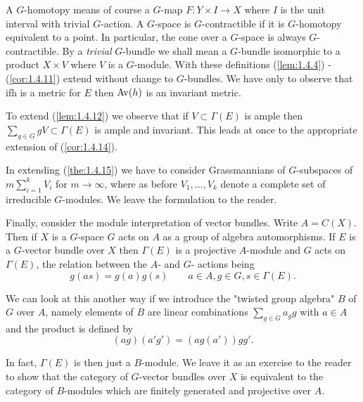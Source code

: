 A $G$-homotopy means of course a $G$-map $F: Y \times I \to X$ where $I$ is the unit interval with trivial $G$-action. A $G$-space is $G$-contractible if it is $G$-homotopy equivalent to a point. In particular, the cone over a $G$-space is always $G$-contractible. By a \textit{trivial} $G$-bundle we shall mean a $G$-bundle isomorphic to a product $X \times V$ where $V$ is a $G$-module. With these definitions (\ref{lem:1.4.4}) - (\ref{cor:1.4.11}) extend without change to $G$-bundles. We have only to observe that if$ $h is a metric for $E$ then $\operatorname{Av}(h)$ is an invariant metric. \par 

To extend (\ref{lem:1.4.12}) we observe that if $V \subset \Gamma(E)$ is ample then $\sum_{g \in G} gV \subset \Gamma(E)$ is ample and invariant. This leads at once to the appropriate extension of (\ref{cor:1.4.14}).  \par

In extending (\ref{the:1.4.15}) we have to consider Grassmannians of $G$-subspaces of $m \sum_{i=1}^k V_i$ for $m \to \infty$, where as before $V_1, \ldots, V_k$ denote a complete set of irreducible $G$-modules. We leave the formulation to the reader. \par

Finally, consider the module interpretation of vector bundles. Write $A = C(X)$. Then if $X$ is a $G$-space $G$ acts on $A$ as a group of algebra automorphisms. If $E$ is a $G$-vector bundle over $X$ then $\Gamma(E)$ is a projective $A$-module and $G$ acts on $\Gamma(E)$, the relation between the $A$- and $G$- actions being
\begin{equation*}
    g(as) = g(a)g(s) \qquad a \in A, g \in G, s \in \Gamma(E). 
\end{equation*}

We can look at this another way if we introduce the "twisted group algebra" $B$ of $G$ over $A$, namely elements of $B$ are linear combinations $\sum_{g \in G} a_g g$ with $a \in A$ and the product is defined by
\begin{equation*}
    (ag)(a'g') = (ag(a'))gg'.
\end{equation*}

In fact, $\Gamma(E)$ is then just a $B$-module. We leave it as an exercise to the reader to show that the category of $G$-vector bundles over $X$ is equivalent to the category of $B$-modules which are finitely generated and projective over $A$. \newpage
